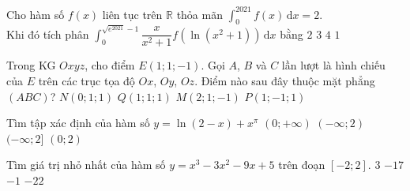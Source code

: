 \begin{ex}%
	Cho hàm số $f(x)$ liên tục trên $\mathbb{R}$ thỏa mãn $\displaystyle\int_{0}^{2021} f(x)\mathrm{\,d}x=2$.\\
	Khi đó tích phân $\displaystyle\int_{0}^{\sqrt{e^{2021}}-1}\dfrac{x}{x^{2}+1} f\left(\ln\left(x^{2}+1\right)\right)\mathrm{\,d}x$ bằng
	\choice
	{$2$}
	{$3$}
	{$4$}
	{\True $1$}
\end{ex}

\begin{ex}%
	Trong KG $Oxyz$, cho điểm $E(1; 1;-1)$. Gọi $A$, $B$ và $C$ lần lượt là hình chiếu của $E$ trên các trục tọa độ $Ox$, $Oy$, $Oz$. Điểm nào sau đây thuộc mặt phẳng $(ABC)$?
	\choice
	{$N(0; 1; 1)$}
	{\True $Q(1; 1; 1)$}
	{$M(2; 1;-1)$}
	{$P(1;-1; 1)$}
\end{ex}


\begin{ex}%
	Tìm tập xác định của hàm số $y=\ln(2-x)+{x}^{\pi}$
	\choice 
	{$(0;+\infty)$}
	{$(-\infty;2)$}
	{$(-\infty;2]$}
	{\True $(0;2)$}
\end{ex} 

\begin{ex}%
	Tìm giá trị nhỏ nhất của hàm số $y=x^3-3x^2-9x+5$ trên đoạn $[-2;2]$.
	\choice 
	{$3$}
	{\True $-17$}
	{$-1$}
	{$-22$}
\end{ex} 

